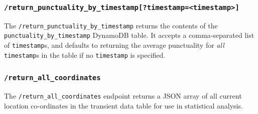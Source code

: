 \documentclass[a4paper,11pt]{report}
\begin{document}
\subsubsection{\texttt{/return\_punctuality\_by\_timestamp[?timestamp=<timestamp>]}}
The \verb|/return_punctuality_by_timestamp| returns the contents of the \verb|punctuality_by_timestamp| DynamoDB table.
It accepts a comma-separated list of \verb|timestamp|s, and defaults to returning the average punctuality for \textit{all} \verb|timestamp|s in the table if no \verb|timestamp| is specified. 

\subsubsection{\texttt{/return\_all\_coordinates}}
The \verb|/return_all_coordinates| endpoint returns a JSON array of all current location co-ordinates in the transient data table for use in statistical analysis.
\end{document}
